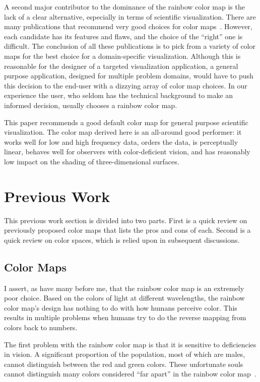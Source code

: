 \documentclass{acmsiggraph}               %
\newcommand{\lcite}[1]{~\cite{#1}}
\begin{document}
A second major contributor to the dominance of the rainbow color map is the
lack of a clear alternative, especially in terms of scientific
visualization.  There are many publications that recommend
very good choices for color maps\lcite{Brewer05,Levkowitz92,Rheingans99,Ware04}.
However, each candidate has its features and flaws, and the choice of
the ``right'' one is difficult.  The conclusion of
all these publications is to pick from a variety of color maps for the best
choice for a domain-specific visualization.  Although this is reasonable
for the designer of a targeted visualization application, a general
purpose application, designed for multiple problem domains, would have to
push this decision to the end-user with a dizzying array of color map
choices.  In our experience the user, who seldom has the technical
background to make an informed decision, usually chooses a rainbow color map.

This paper recommends a good default
color map for general purpose scientific visualization.  The
color map derived here is an all-around good performer: it works well for
low and high frequency data, orders the data, is perceptually linear,
behaves well for observers with color-deficient vision, and has reasonably
low impact on the shading of three-dimensional surfaces.


\section{Previous Work}
\label{sec:PreviousWork}

This previous work section is divided into two parts.  First is a
quick review on previously proposed color maps that lists the pros and
cons of each.  Second is a quick review on color spaces,
which is relied upon in subsequent discussions.

\subsection{Color Maps}
\label{sec:PreviousWork:ColorMaps}

I assert, as have many before me, that the rainbow color map is an
extremely poor choice.  Based on the colors of light at different
wavelengths, the rainbow color map's design has nothing to do with how
humans perceive color.  This results in multiple problems when humans try
to do the reverse mapping from colors back to numbers.

The first problem with the rainbow color map is that it is sensitive to
deficiencies in vision.  A significant proportion of the population, most
of which are males, cannot distinguish between the red and green colors.
These unfortunate souls cannot distinguish many colors considered ``far
apart'' in the rainbow color map\lcite{Light04}.
\end{document}
